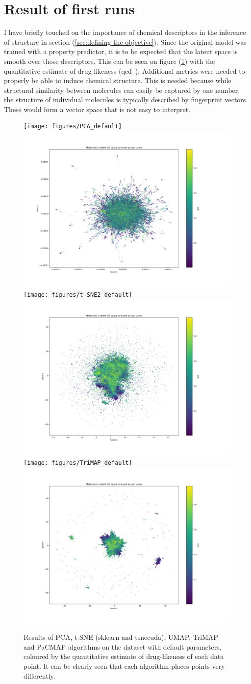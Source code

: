 \section{Result of first runs}\label{sec:result-of-first-runs}

I have briefly touched on the importance of chemical descriptors in the inference of structure in section (\ref{sec:defining-the-objective}). Since the original model was trained with a property predictor, it is to be expected that the latent space is smooth over those descriptors. This can be seen on figure (\ref{fig:default_run}) with the quantitative estimate of drug-likeness (qed~\cite{bib:qed}). Additional metrics were needed to properly be able to induce chemical structure. This is needed because while structural similarity between molecules can easily be captured by one number, the structure of individual molecules is typically described by fingerprint vectors. These would form a vector space that is not easy to interpret.

\begin{figure}[!ht]
	\centering
	\texttt{[image: figures/PCA\_default]}
	\includegraphics[width=0.49\columnwidth, keepaspectratio]{figures/t-SNE_default}
	\texttt{[image: figures/t-SNE2\_default]}
	\includegraphics[width=0.49\columnwidth, keepaspectratio]{figures/UMAP_default}
	\texttt{[image: figures/TriMAP\_default]}
	\includegraphics[width=0.49\columnwidth, keepaspectratio]{figures/PaCMAP_default}
	\caption{Results of PCA, t-SNE (sklearn and tsnecuda), UMAP, TriMAP and PaCMAP algorithms on the dataset with default parameters, coloured by the quantitative estimate of drug-likeness of each data point. It can be clearly seen that each algorithm places points very differently.}
	\label{fig:default_run}
\end{figure}

